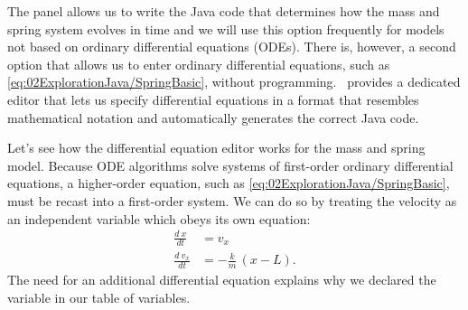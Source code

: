 The  panel allows us to write the Java code that determines how the mass and spring system evolves in time and we will use this option frequently for models not based on ordinary differential equations (ODEs). There is, however, a second option that allows us to enter ordinary differential equations, such as \eqref{eq:02ExplorationJava/SpringBasic}, without programming.  \ejs\ provides a dedicated editor that lets us specify differential equations in a format that resembles mathematical
notation and automatically generates the correct Java code.

Let's see how the differential equation editor works for the mass and spring model. Because ODE algorithms solve
systems of first-order ordinary differential equations, a higher-order equation, such as
\eqref{eq:02ExplorationJava/SpringBasic}, must be recast into a first-order system.   We can do so by treating the
velocity as an independent variable which obeys its own equation:
\begin{align}
  \frac{d\ x} {dt} &= v_x                           \label{eq:02ExplorationJava/SpringBasicODE1} \\
  \frac{d\ v_x}{dt} &= -\frac{k}{m}\,(x-L). \label{eq:02ExplorationJava/SpringBasicODE2}
\end{align}
The need for an additional differential equation explains why we declared the  variable in our table of
variables.

